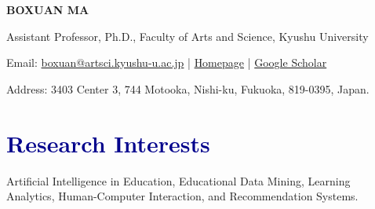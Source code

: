 \documentclass[a4paper,11pt]{article}
\newcommand{\socialicon}[1]{\raisebox{-0.05em}{\resizebox{!}{1em}{#1}}}
\newcommand{\ieeeicon}[1]{\raisebox{-0.3em}{\resizebox{!}{1.3em}{#1}}}
\newcommand{\headerfontiii}{\fontfamily{ppl}\selectfont} %
\begin{document}
\headerfontiii

\begin{center}
    {\Huge\textbf{BOXUAN MA}}
\end{center}
\vspace{-4mm}

\begin{center}
{\large Assistant Professor, Ph.D., Faculty of Arts and Science, Kyushu University }
\end{center}

\begin{center}
    \small{
    Email: \href{mailto:boxuan@artsci.kyushu-u.ac.jp}{boxuan@artsci.kyushu-u.ac.jp} | \href{https://boxuanma.github.io/}{Homepage} |
    \href{https://scholar.google.com/citations?user=g7B8oj4AAAAJ}{Google Scholar}
    }
\end{center}


\vspace{-8mm}
\begin{center}
    \small{Address: 3403 Center 3, 744 Motooka, Nishi-ku, Fukuoka, 819-0395, Japan.}
\end{center}

\vspace{-4mm}

%
%

\section{\textcolor{darkblue}{\textbf{Research Interests}}}
Artificial Intelligence in Education, Educational Data Mining, Learning Analytics, Human-Computer Interaction, and Recommendation Systems.
\end{document}
